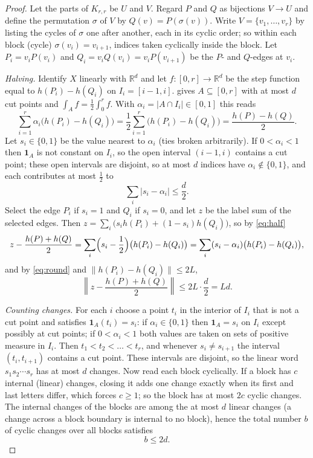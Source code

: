 \documentclass[11pt,a4paper]{article}
\theoremstyle{plain}
\theoremstyle{definition}
\theoremstyle{remark}
\newcommand{\R}{\mathbb R}
\newcommand{\vone}{\mathbf 1}
\newcommand{\norm}[1]{\left\|#1\right\|}
\begin{document}
\label{pf:splice}
\lemsplice*
\begin{proof}
Let the parts of $K_{r,r}$ be $U$ and $V$. Regard $P$ and $Q$ as bijections $V\to U$ and define the permutation $\sigma$ of $V$ by $Q(v)=P(\sigma(v))$. Write $V=\{v_1,\dots,v_r\}$ by listing the cycles of $\sigma$ one after another, each in its cyclic order; so within each block (cycle) $\sigma(v_i)=v_{i+1}$, indices taken cyclically inside the block. Let $P_i=v_iP(v_i)$ and $Q_i=v_iQ(v_i)=v_iP(v_{i+1})$ be the $P$- and $Q$-edges at $v_i$.

\emph{Halving.} Identify $X$ linearly with $\R^d$ and let $f\colon[0,r]\to\R^d$ be the step function equal to $h(P_i)-h(Q_i)$ on $I_i=[i-1,i]$.  gives $A\subseteq[0,r]$ with at most $d$ cut points and $\int_Af=\frac12\int_0^rf$. With $\alpha_i=|A\cap I_i|\in[0,1]$ this reads
\begin{equation}\label{eq:half}
 \sum_{i=1}^r\alpha_i\bigl(h(P_i)-h(Q_i)\bigr)=\frac12\sum_{i=1}^r\bigl(h(P_i)-h(Q_i)\bigr)=\frac{h(P)-h(Q)}2 .
\end{equation}
Let $s_i\in\{0,1\}$ be the value nearest to $\alpha_i$ (ties broken arbitrarily). If $0<\alpha_i<1$ then $\vone_A$ is not constant on $I_i$, so the open interval $(i-1,i)$ contains a cut point; these open intervals are disjoint, so at most $d$ indices have $\alpha_i\notin\{0,1\}$, and each contributes at most $\frac12$ to
\begin{equation}\label{eq:round}
 \sum_i|s_i-\alpha_i|\le\frac d2 .
\end{equation}
Select the edge $P_i$ if $s_i=1$ and $Q_i$ if $s_i=0$, and let $z$ be the label sum of the selected edges. Then $z=\sum_i\bigl(s_ih(P_i)+(1-s_i)h(Q_i)\bigr)$, so by \eqref{eq:half}
\[
 z-\frac{h(P)+h(Q)}2=\sum_i\Bigl(s_i-\frac12\Bigr)\bigl(h(P_i)-h(Q_i)\bigr)=\sum_i(s_i-\alpha_i)\bigl(h(P_i)-h(Q_i)\bigr),
\]
and by \eqref{eq:round} and $\|h(P_i)-h(Q_i)\|\le2L$,
\begin{equation}\label{eq:zmid}
 \norm{z-\frac{h(P)+h(Q)}2}\le 2L\cdot\frac d2=Ld .
\end{equation}

\emph{Counting changes.} For each $i$ choose a point $t_i$ in the interior of $I_i$ that is not a cut point and satisfies $\vone_A(t_i)=s_i$: if $\alpha_i\in\{0,1\}$ then $\vone_A=s_i$ on $I_i$ except possibly at cut points; if $0<\alpha_i<1$ both values are taken on sets of positive measure in $I_i$. Then $t_1<t_2<\dots<t_r$, and whenever $s_i\ne s_{i+1}$ the interval $(t_i,t_{i+1})$ contains a cut point. These intervals are disjoint, so the linear word $s_1s_2\cdots s_r$ has at most $d$ changes. Now read each block cyclically. If a block has $c$ internal (linear) changes, closing it adds one change exactly when its first and last letters differ, which forces $c\ge1$; so the block has at most $2c$ cyclic changes. The internal changes of the blocks are among the at most $d$ linear changes (a change across a block boundary is internal to no block), hence the total number $b$ of cyclic changes over all blocks satisfies
\begin{equation}\label{eq:b}
 b\le 2d .
\end{equation}


\end{proof}
\end{document}
